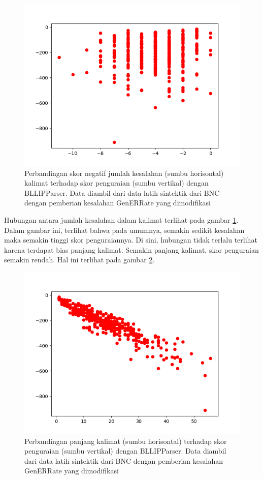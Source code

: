 \documentclass[conference]{IEEEtran}
\begin{document}
\begin{figure}[h]
\centerline{\includegraphics[width=\columnwidth]{figures/figscoretoparseprob.png}}
\caption{Perbandingan skor negatif jumlah kesalahan (sumbu horisontal) kalimat terhadap skor penguraian (sumbu vertikal) dengan BLLIPParser. Data diambil dari data latih sintektik dari BNC dengan pemberian kesalahan GenERRate yang dimodifikasi}
\label{figscoretoparseprob}
\end{figure}

Hubungan antara jumlah kesalahan dalam kalimat terlihat pada gambar \ref{figscoretoparseprob}. Dalam gambar ini, terlihat bahwa pada umumnya, semakin sedikit kesalahan maka semakin tinggi skor penguraiannya. Di sini, hubungan tidak terlalu terlihat karena terdapat bias panjang kalimat. Semakin panjang kalimat, skor penguraian semakin rendah. Hal ini terlihat pada gambar \ref{figlentoparseprob}.

\begin{figure}[h]
\centerline{\includegraphics[width=\columnwidth]{figures/figlentoparseprob.png}}
\caption{Perbandingan panjang kalimat (sumbu horisontal) terhadap skor penguraian (sumbu vertikal) dengan BLLIPParser. Data diambil dari data latih sintektik dari BNC dengan pemberian kesalahan GenERRate yang dimodifikasi}
\label{figlentoparseprob}
\end{figure}
\end{document}
